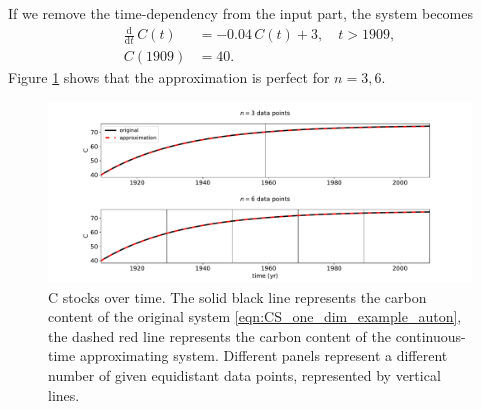 \documentclass[11pt,a4paper]{article}
\newcommand{\deriv}[1]{\frac{\mathrm{d}}{\mathrm{d}#1}}
\begin{document}
If we remove the time-dependency from the input part, the system becomes
\begin{equation}\label{eqn:CS_one_dim_example_auton}
    \begin{aligned}
        \deriv{t}\,C(t) &= -0.04\,C(t) + 3,\quad t>1909,\\
        C(1909) &= 40.
    \end{aligned}
\end{equation}
Figure \ref{fig:CS_one_dim_example_auton} shows that the approximation is perfect for $n=3,6$.
\begin{figure}[htbp]
    \centering 
    \includegraphics[width=1.0\linewidth]{figs/interpol_pwc_1_auton.pdf}
    \caption{C stocks over time.
        The solid black line represents the carbon content of the original system \eqref{eqn:CS_one_dim_example_auton}, the dashed red line represents the carbon content of the continuous-time approximating system.
        Different panels represent a different number of given equidistant data points, represented by vertical lines.
        }
    \label{fig:CS_one_dim_example_auton}
\end{figure}        
\end{document}
